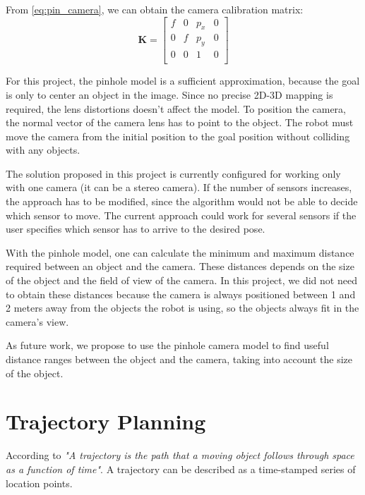 From \ref{eq:pin_camera}, we can obtain the camera calibration matrix:
\begin{equation}
\mathbf{K}= \left[ \begin{array}{cccc}
f & 0 & p_{x} & 0 \\
0 & f & p_{y} & 0 \\
0 & 0 & 1 & 0 \\
\end{array}
\right]
\label{eq:camera_calib}
\end{equation}

For this project, the pinhole model is a sufficient approximation, because the goal is only to center an object in the image. Since no precise 2D-3D mapping is required, the lens distortions doesn't affect the model. To position the camera, the normal vector of the camera lens has to point to the object. The robot must move the camera from the initial position to the goal position without colliding with any objects. 

The solution proposed in this project is currently configured for working only with one camera (it can be a stereo camera). If the number of sensors increases, the approach has to be modified, since the algorithm would not be able to decide which sensor to move. The current approach could work for several sensors if the user specifies which sensor has to arrive to the desired pose.

With the pinhole model, one can calculate the minimum and maximum distance required between an object and the camera. These distances depends on the size of the object and the field of view of the camera. In this project, we did not need to obtain these distances because the camera is always positioned between 1 and 2 meters away from the objects the robot is using, so the objects always fit in the camera's view. 

As future work, we propose to use the pinhole camera model to find useful distance ranges between the object and the camera, taking into account the size of the object.

\section{Trajectory Planning}

According to \citet[chap. 1, page 6]{trajectory} \textit{"A trajectory is the path that a moving object follows through space as a function of time"}. A trajectory can be described as a time-stamped series of location points.

